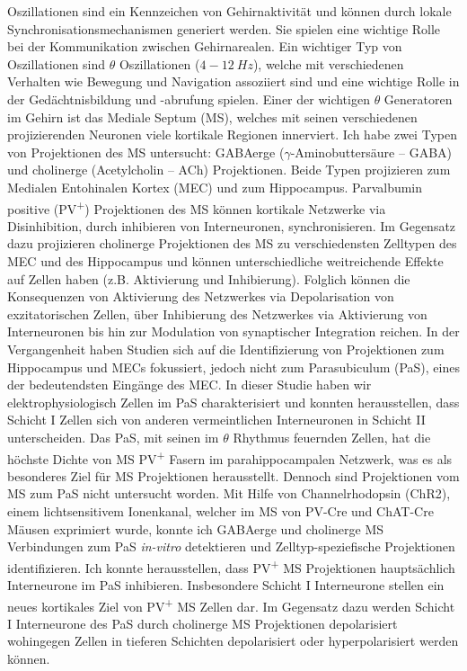 \documentclass[
  12pt,
  a4paper,
  openany]{book}
\begin{document}
Oszillationen sind ein Kennzeichen von Gehirnaktivität und können durch lokale Synchronisationsmechanismen generiert werden. Sie spielen eine wichtige Rolle bei der Kommunikation zwischen Gehirnarealen.
Ein wichtiger Typ von Oszillationen sind \(\theta\) Oszillationen (\(4-12\ Hz\)), welche mit verschiedenen Verhalten wie Bewegung und Navigation assoziiert sind und eine wichtige Rolle in der Gedächtnisbildung und -abrufung spielen.
Einer der wichtigen \(\theta\) Generatoren im Gehirn ist das Mediale Septum (MS), welches mit seinen verschiedenen projizierenden Neuronen viele kortikale Regionen innerviert.
Ich habe zwei Typen von Projektionen des MS untersucht: GABAerge (\(\gamma\)-Aminobuttersäure -- GABA) und cholinerge (Acetylcholin -- ACh) Projektionen. Beide Typen projizieren zum Medialen Entohinalen Kortex (MEC) und zum Hippocampus. Parvalbumin positive (PV\textsuperscript{+}) Projektionen des MS können kortikale Netzwerke via Disinhibition, durch inhibieren von Interneuronen, synchronisieren. Im Gegensatz dazu projizieren cholinerge Projektionen des MS zu verschiedensten Zelltypen des MEC und des Hippocampus und können unterschiedliche weitreichende Effekte auf Zellen haben (z.B. Aktivierung und Inhibierung). Folglich können die Konsequenzen von Aktivierung des Netzwerkes via Depolarisation von exzitatorischen Zellen, über Inhibierung des Netzwerkes via Aktivierung von Interneuronen bis hin zur Modulation von synaptischer Integration reichen.
In der Vergangenheit haben Studien sich auf die Identifizierung von Projektionen zum Hippocampus und MECs fokussiert, jedoch nicht zum Parasubiculum (PaS), eines der bedeutendsten Eingänge des MEC. In dieser Studie haben wir elektrophysiologisch Zellen im PaS charakterisiert und konnten herausstellen, dass Schicht I Zellen sich von anderen vermeintlichen Interneuronen in Schicht II unterscheiden.
Das PaS, mit seinen im \(\theta\) Rhythmus feuernden Zellen, hat die höchste Dichte von MS PV\textsuperscript{+} Fasern im parahippocampalen Netzwerk, was es als besonderes Ziel für MS Projektionen herausstellt. Dennoch sind Projektionen vom MS zum PaS nicht untersucht worden. Mit Hilfe von Channelrhodopsin (ChR2), einem lichtsensitivem Ionenkanal, welcher im MS von PV-Cre und ChAT-Cre Mäusen exprimiert wurde, konnte ich GABAerge und cholinerge MS Verbindungen zum PaS \emph{in-vitro} detektieren und Zelltyp-speziefische Projektionen identifizieren.
Ich konnte herausstellen, dass PV\textsuperscript{+} MS Projektionen hauptsächlich Interneurone im PaS inhibieren. Insbesondere Schicht I Interneurone stellen ein neues kortikales Ziel von PV\textsuperscript{+} MS Zellen dar. Im Gegensatz dazu werden Schicht I Interneurone des PaS durch cholinerge MS Projektionen depolarisiert wohingegen Zellen in tieferen Schichten depolarisiert oder hyperpolarisiert werden können.
\end{document}
